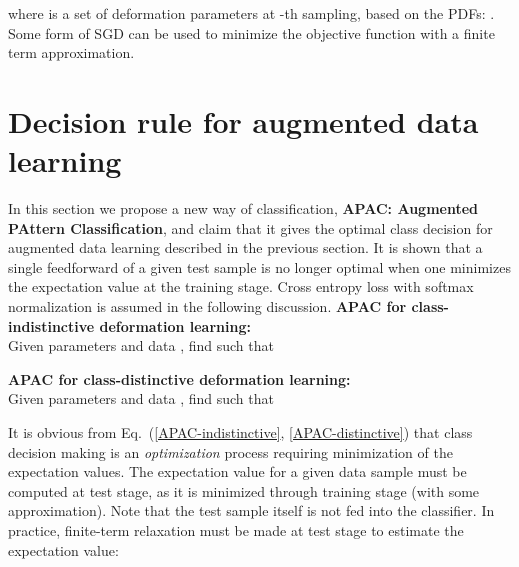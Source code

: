 \documentclass[10pt,twocolumn,letterpaper]{article}
\begin{document}
where  is a
set of deformation parameters at -th sampling, based on the 
PDFs: .
Some form of SGD can be used to minimize the objective function
with a finite term approximation.

\section{Decision rule for augmented data learning}

In this section we propose a new way of classification, 
{\bf APAC: Augmented PAttern Classification}, and claim that
it gives the optimal class decision for augmented data learning
described in the previous section.
It is shown that 
a single feedforward of a given test sample is no longer optimal 
when one minimizes the expectation value at the training stage.
Cross entropy loss with softmax normalization is assumed
in the following discussion.
\newline
\newline
{\bf APAC for class-indistinctive deformation learning:} \\
Given parameters  and data , 
find  such that 

\newline
{\bf APAC for class-distinctive deformation learning:} \\
Given parameters  and data , 
find  such that 


It is obvious from 
Eq.~(\ref{APAC-indistinctive}, \ref{APAC-distinctive})
that class decision making is an {\it optimization} process
requiring minimization of the expectation values.
The expectation value for a given data sample 
must be computed at test stage,
as it is minimized through training stage (with some approximation).
Note that the test sample itself is not fed into the classifier.
In practice, finite-term relaxation must be made at test stage
to estimate the expectation value:
\end{document}
